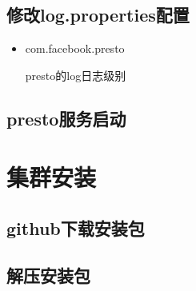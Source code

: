 \documentclass[letterpaper,10pt,english]{sphinxmanual}
\begin{document}
\subsection{修改log.properties配置}
\label{\detokenize{installation/standardlone:log-properties}}
\noindent{}
\begin{itemize}
\item {} 
com.facebook.presto

presto的log日志级别

\end{itemize}


\subsection{presto服务启动}
\label{\detokenize{installation/standardlone:presto}}
\begin{sphinxVerbatim}[commandchars=\\\{\}]
 
 
\end{sphinxVerbatim}

\noindent{}


\section{集群安装}
\label{\detokenize{installation/cluster:id1}}\label{\detokenize{installation/cluster::doc}}

\subsection{github下载安装包}
\label{\detokenize{installation/cluster:github}}
\begin{sphinxVerbatim}[commandchars=\\\{\}]
 
\end{sphinxVerbatim}


\subsection{解压安装包}
\label{\detokenize{installation/cluster:id2}}
\begin{sphinxVerbatim}[commandchars=\\\{\}]
    
\end{sphinxVerbatim}
\end{document}
